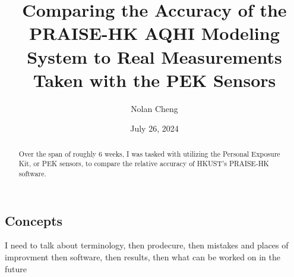 \documentclass{article}
\title{Comparing the Accuracy of the PRAISE-HK AQHI Modeling System to 
Real Measurements Taken with the PEK Sensors}
\author{Nolan Cheng}
\date{July 26, 2024}
\begin{document}
\maketitle
\begin{multicols}{2}

\begin{abstract}
    Over the span of roughly 6 weeks, I was tasked with utilizing the 
    Personal Exposure Kit, or PEK sensors, to compare the relative accuracy 
    of HKUST's PRAISE-HK software.
\end{abstract}

\section{Concepts}
\label{section:Concepts}



I need to talk about terminology, then prodecure, then mistakes and places of improvment
then software, then results, then what can be worked on in the future

\end{multicols}
\end{document}
